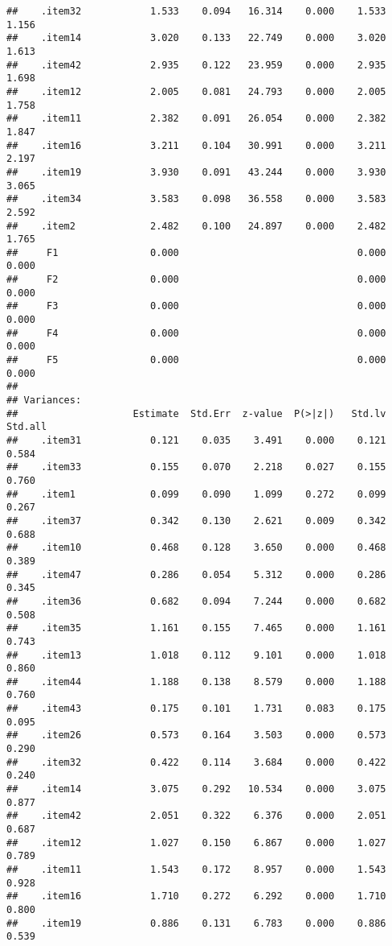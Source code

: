 \documentclass[
  english,
  man]{apa6}
\begin{document}
\begin{verbatim}
##    .item32            1.533    0.094   16.314    0.000    1.533    1.156
##    .item14            3.020    0.133   22.749    0.000    3.020    1.613
##    .item42            2.935    0.122   23.959    0.000    2.935    1.698
##    .item12            2.005    0.081   24.793    0.000    2.005    1.758
##    .item11            2.382    0.091   26.054    0.000    2.382    1.847
##    .item16            3.211    0.104   30.991    0.000    3.211    2.197
##    .item19            3.930    0.091   43.244    0.000    3.930    3.065
##    .item34            3.583    0.098   36.558    0.000    3.583    2.592
##    .item2             2.482    0.100   24.897    0.000    2.482    1.765
##     F1                0.000                               0.000    0.000
##     F2                0.000                               0.000    0.000
##     F3                0.000                               0.000    0.000
##     F4                0.000                               0.000    0.000
##     F5                0.000                               0.000    0.000
## 
## Variances:
##                    Estimate  Std.Err  z-value  P(>|z|)   Std.lv  Std.all
##    .item31            0.121    0.035    3.491    0.000    0.121    0.584
##    .item33            0.155    0.070    2.218    0.027    0.155    0.760
##    .item1             0.099    0.090    1.099    0.272    0.099    0.267
##    .item37            0.342    0.130    2.621    0.009    0.342    0.688
##    .item10            0.468    0.128    3.650    0.000    0.468    0.389
##    .item47            0.286    0.054    5.312    0.000    0.286    0.345
##    .item36            0.682    0.094    7.244    0.000    0.682    0.508
##    .item35            1.161    0.155    7.465    0.000    1.161    0.743
##    .item13            1.018    0.112    9.101    0.000    1.018    0.860
##    .item44            1.188    0.138    8.579    0.000    1.188    0.760
##    .item43            0.175    0.101    1.731    0.083    0.175    0.095
##    .item26            0.573    0.164    3.503    0.000    0.573    0.290
##    .item32            0.422    0.114    3.684    0.000    0.422    0.240
##    .item14            3.075    0.292   10.534    0.000    3.075    0.877
##    .item42            2.051    0.322    6.376    0.000    2.051    0.687
##    .item12            1.027    0.150    6.867    0.000    1.027    0.789
##    .item11            1.543    0.172    8.957    0.000    1.543    0.928
##    .item16            1.710    0.272    6.292    0.000    1.710    0.800
##    .item19            0.886    0.131    6.783    0.000    0.886    0.539

\end{verbatim}
\end{document}
